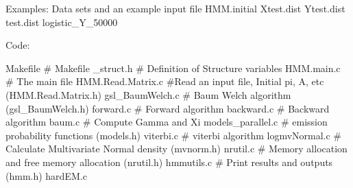 Examples: Data sets and an example input file
HMM.initial
Xtest.dist
Ytest.dist
test.dist
logistic_Y_50000 

Code:

Makefile # Makefile 
_struct.h # Definition of Structure variables
HMM.main.c # The main file
HMM.Read.Matrix.c  #Read an input file, Initial pi, A, etc 
(HMM.Read.Matrix.h)
gsl_BaumWelch.c # Baum Welch algorithm 
(gsl_BaumWelch.h)
forward.c # Forward algorithm
backward.c # Backward algorithm
baum.c # Compute Gamma and Xi  
models_parallel.c # emission probability functions
(models.h)
viterbi.c # viterbi algorithm
logmvNormal.c # Calculate Multivariate Normal density 
(mvnorm.h)
nrutil.c  # Memory allocation and free memory allocation
(nrutil.h) 
hmmutils.c  # Print results and outputs
(hmm.h)
hardEM.c 
